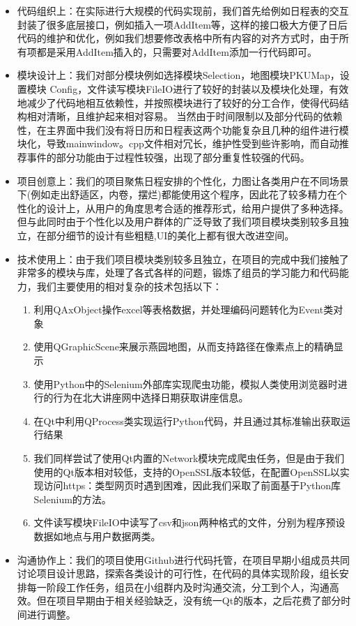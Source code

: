 \documentclass[11pt,hyperref,a4paper,UTF8]{ctexart}
\begin{document}
\begin{CJK}{UTF8}{gkai}
\begin{itemize}
    \item 代码组织上：在实际进行大规模的代码实现前，我们首先给例如日程表的交互封装了很多底层接口，例如插入一项AddItem等，这样的接口极大方便了日后代码的维护和优化，例如我们想要修改表格中所有内容的对齐方式时，由于所有项都是采用AddItem插入的，只需要对AddItem添加一行代码即可。
    \item 模块设计上：我们对部分模块例如选择模块Selection，地图模块PKUMap，设置模块 Config，文件读写模块FileIO进行了较好的封装以及模块化处理，有效地减少了代码地相互依赖性，并按照模块进行了较好的分工合作，使得代码结构相对清晰，且维护起来相对容易。
    当然由于时间限制以及部分代码的依赖性，在主界面中我们没有将日历和日程表这两个功能复杂且几种的组件进行模块化，导致mainwindow。cpp文件相对冗长，维护性受到些许影响，而自动推荐事件的部分功能由于过程性较强，出现了部分重复性较强的代码。
    
    \item 项目创意上：我们的项目聚焦日程安排的个性化，力图让各类用户在不同场景下(例如走出舒适区，内卷，摆烂)都能使用这个程序，因此花了较多精力在个性化的设计上，从用户的角度思考合适的推荐形式，给用户提供了多种选择。但与此同时由于个性化以及用户群体的广泛导致了我们项目模块类别较多且独立，在部分细节的设计有些粗糙,UI的美化上都有很大改进空间。
    
    \item 技术使用上：由于我们项目模块类别较多且独立，在项目的完成中我们接触了非常多的模块与库，处理了各式各样的问题，锻炼了组员的学习能力和代码能力，我们主要使用的相对复杂的技术包括以下：
    \begin{enumerate}
        \item 利用QAxObject操作excel等表格数据，并处理编码问题转化为Event类对象
        \item 使用QGraphicScene来展示燕园地图，从而支持路径在像素点上的精确显示
        \item 使用Python中的Selenium外部库实现爬虫功能，模拟人类使用浏览器时进行的行为在北大讲座网中选择日期获取讲座信息。
        \item 在Qt中利用QProcess类实现运行Python代码，并且通过其标准输出获取运行结果
        \item 我们同样尝试了使用Qt内置的Network模块完成爬虫任务，但是由于我们使用的Qt版本相对较低，支持的OpenSSL版本较低，在配置OpenSSL以实现访问https：类型网页时遇到困难，因此我们采取了前面基于Python库Selenium的方法。
        \item 文件读写模块FileIO中读写了csv和json两种格式的文件，分别为程序预设数据如地点与用户数据两类。
    \end{enumerate}
    \item 沟通协作上：我们的项目使用Github进行代码托管，在项目早期小组成员共同讨论项目设计思路，探索各类设计的可行性，在代码的具体实现阶段，组长安排每一阶段工作任务，组员在小组群内及时沟通交流，分工到个人，沟通高效。但在项目早期由于相关经验缺乏，没有统一Qt的版本，之后花费了部分时间进行调整。
\end{itemize}


\end{CJK}
\end{document}
